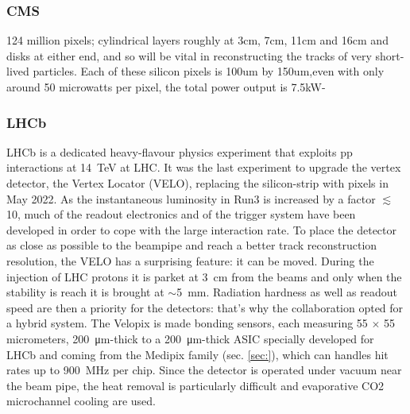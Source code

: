         \subsubsection{CMS}
        124 million pixels; cylindrical layers roughly at 3cm, 7cm, 11cm and 16cm and disks at either end, and so will be vital in reconstructing the tracks of very short-lived particles. Each of these silicon pixels is 100um by 150um,even with  only around 50 microwatts per pixel, the total power output is 7.5kW-

        \subsubsection{LHCb}
        LHCb is a dedicated heavy-flavour physics experiment that exploits pp interactions at \SI{14}{TeV} at LHC. 
        It was the last experiment to upgrade the vertex detector, the Vertex Locator (VELO), replacing the silicon-strip with pixels in May 2022. 
        As the instantaneous luminosity in Run3 is increased by a factor $\lesssim$10, much of the readout electronics and of the trigger system have been developed in order to cope with the large interaction rate.
        To place the detector as close as possible to the beampipe and reach a better track reconstruction resolution, the VELO has a surprising feature: it can be moved. During the injection of LHC protons it is parket at \SI{3}{cm} from the beams and only when the stability is reach it is brought at $\sim$\SI{5}{mm}. Radiation hardness as well as readout speed are then a priority for the detectors: that's why the collaboration opted for a hybrid system. 
        The Velopix is made bonding sensors, each measuring 55 $\times$ 55 micrometers, \SI{200}{\um}-thick to a \SI{200}{\um}-thick ASIC specially developed for LHCb and coming from the Medipix family (sec. \ref{sec:}), which can handles hit rates up to \SI{900}{MHz} per chip.
        Since the detector is operated under vacuum near the beam pipe, the heat removal is particularly difficult and evaporative CO2 microchannel cooling are used. 

